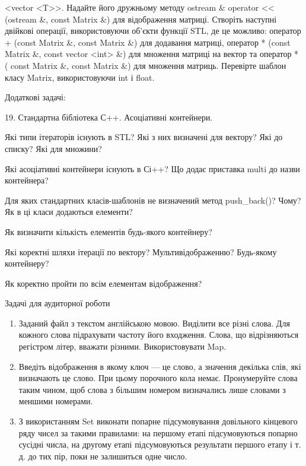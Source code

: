 \documentclass[]{article}
\makeatletter
\newcommand{\xslalph}[1]{\expandafter\@xslalph\csname c@#1\endcsname}
\newcommand{\@xslalph}[1]{%
    \ifcase#1\or а\or б\or в\or г\or д\or e\or є\or ж\or з\or i%
    \or й\or к\or л\or м\or н\or о\or п\or р\or с\or т%
    \or у\or ф\or х\or ц\or ч\or ш\or ю\or я\or аа\or бб\or вв%
    \else\@ctrerr\fi%
}
\makeatother
\begin{document}
\begin{enumerate}
\begin{enumerate}[label=\xslalph*)]
\begin{enumerate}
\begin{enumerate}[label=\xslalph*)]
\begin{enumerate}
  \textless{}vector \textless{}T\textgreater{}\textgreater{}. Надайте
  його дружньому методу ostream \& operator \textless{}\textless{}
  (ostream \&, const Matrix \&) для відображення матриці. Створіть
  наступні двійкові операції, використовуючи об'єкти функції STL, де це
  можливо: оператор + (const Matrix \&, const Matrix \&) для додавання
  матриці, оператор * (const Matrix \&, const vector
  \textless{}int\textgreater{} \&) для множення матриці на вектор та
  оператор * ( const Matrix \&, const Matrix \&) для множення матриць.
  Перевірте шаблон класу Matrix, використовуючи int і float.
\end{enumerate}

Додаткові задачі:

19. Стандартна бібліотека С++. Асоціативні контейнери.

Які типи ітераторів існують в STL? Які з них визначені для вектору? Які
до списку? Які для множини?

Які асоціативні контейнери існують в Сі++? Що додає приставка multi до
назви контейнера?

Для яких стандартних класів-шаблонів не визначений метод push\_back()?
Чому? Як в ці класи додаються елементи?

Як визначити кількість елементів будь-якого контейнеру?

Які коректні шляхи ітерації по вектору? Мультивідображенню? Будь-якому
контейнеру?

Як коректно пройти по всім елементам відображення?

Задачі для аудиторної роботи

\begin{enumerate}
\def\labelenumi{\arabic{enumi})}
\item
  Заданий файл з текстом англійською мовою. Виділити все різні слова.
  Для кожного слова підрахувати частоту його входження. Слова, що
  відрізняються регістром літер, вважати різними. Використовувати Map.
\item
  Введіть відображення в якому ключ --- це слово, а значення декілька
  слів, які визначають це слово. При цьому порочного кола немає.
  Пронумеруйте слова таким чином, щоб слова з більшим номером
  визначались лише словами з меншими номерами.
\item
  З використанням Set виконати попарне підсумовування довільного
  кінцевого ряду чисел за такими правилами: на першому етапі
  підсумовуються попарно сусідні числа, на другому етапі підсумовуються
  результати першого етапу і т. д. до тих пір, поки не залишиться одне
  число.
\end{enumerate}


\end{enumerate}
\end{enumerate}
\end{enumerate}
\end{enumerate}
\end{document}
